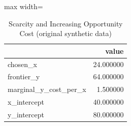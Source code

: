 \begin{table}[htbp]
\centering
\caption{Scarcity and Increasing Opportunity Cost (original synthetic data)}
\begingroup
\small
\setlength{\tabcolsep}{6pt}
\renewcommand{\arraystretch}{1.12}
\begin{adjustbox}{max width=\linewidth}
\begin{tabular}{@{}lr@{}}
\toprule
 & value \\
\midrule
chosen\_x & 24.000000 \\
frontier\_y & 64.000000 \\
marginal\_y\_cost\_per\_x & 1.500000 \\
x\_intercept & 40.000000 \\
y\_intercept & 80.000000 \\
\bottomrule
\end{tabular}
\end{adjustbox}
\endgroup
\end{table}